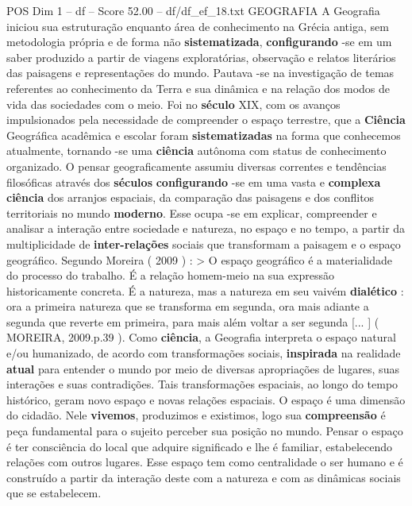 \begin{textsample}{POS Dim 1 – df – Score 52.00 – df/df\_ef\_18.txt}  \label{ex:f1_pos_125}
GEOGRAFIA A Geografia iniciou sua estruturação enquanto área de conhecimento na Grécia antiga, sem metodologia própria e de forma não \textbf{sistematizada}, \textbf{configurando} -se em um saber produzido a partir de viagens exploratórias, observação e relatos literários das paisagens e representações do mundo.
Pautava -se na investigação de temas referentes ao conhecimento da Terra e sua dinâmica e na relação dos modos de vida das sociedades com o meio.
Foi no \textbf{século} XIX, com os avanços impulsionados pela necessidade de compreender o espaço terrestre, que a \textbf{Ciência} Geográfica acadêmica e escolar foram \textbf{sistematizadas} na forma que conhecemos atualmente, tornando -se uma \textbf{ciência} autônoma com status de conhecimento organizado.
O pensar geograficamente assumiu diversas correntes e tendências filosóficas através dos \textbf{séculos} \textbf{configurando} -se em uma vasta e \textbf{complexa} \textbf{ciência} dos arranjos espaciais, da comparação das paisagens e dos conflitos territoriais no mundo \textbf{moderno}.
Esse ocupa -se em explicar, compreender e analisar a interação entre sociedade e natureza, no espaço e no tempo, a partir da multiplicidade de \textbf{inter-relações} sociais que transformam a paisagem e o espaço geográfico.
Segundo Moreira ( 2009 ) : > O espaço geográfico é a materialidade do processo do trabalho.
É a relação homem-meio na sua expressão historicamente concreta.
É a natureza, mas a natureza em seu vaivém \textbf{dialético} : ora a primeira natureza que se transforma em segunda, ora mais adiante a segunda que reverte em primeira, para mais além voltar a ser segunda [... ] ( MOREIRA, 2009.p.39 ).
Como \textbf{ciência}, a Geografia interpreta o espaço natural e/ou humanizado, de acordo com transformações sociais, \textbf{inspirada} na realidade \textbf{atual} para entender o mundo por meio de diversas apropriações de lugares, suas interações e suas contradições.
Tais transformações espaciais, ao longo do tempo histórico, geram novo espaço e novas relações espaciais.
O espaço é uma dimensão do cidadão.
Nele \textbf{vivemos}, produzimos e existimos, logo sua \textbf{compreensão} é peça fundamental para o sujeito perceber sua posição no mundo.
Pensar o espaço é ter consciência do local que adquire significado e lhe é familiar, estabelecendo relações com outros lugares.
Esse espaço tem como centralidade o ser humano e é construído a partir da interação deste com a natureza e com as dinâmicas sociais que se estabelecem.

\end{textsample}
